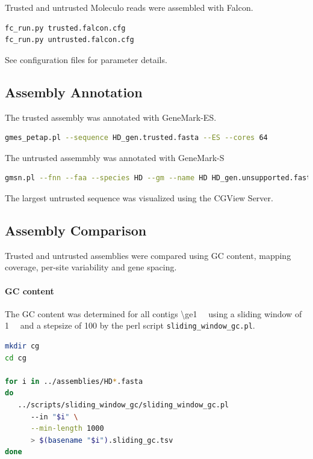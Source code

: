 \documentclass[12pt,a4paper]{scrartcl}
\begin{document}
Trusted and untrusted Moleculo reads were assembled with Falcon.

\begin{lstlisting}[language=bash]
fc_run.py trusted.falcon.cfg
fc_run.py untrusted.falcon.cfg
\end{lstlisting}

See configuration files for parameter details.

\subsection*{Assembly Annotation}
The trusted assembly was annotated with GeneMark-ES.

\begin{lstlisting}[language=bash]
gmes_petap.pl --sequence HD_gen.trusted.fasta --ES --cores 64
\end{lstlisting}

The untrusted assemmbly was annotated with GeneMark-S

\begin{lstlisting}[language=bash]
gmsn.pl --fnn --faa --species HD --gm --name HD HD_gen.unsupported.fasta
\end{lstlisting}

The largest untrusted sequence was visualized using the CGView Server.

\subsection*{Assembly Comparison}

Trusted and untrusted assemblies were compared using GC content, mapping coverage, per-site variability and gene spacing.

\paragraph{GC content}
The GC content was determined for all contigs
\SI{\ge1}{\kilo\basepair} using a sliding window of
\SI{1}{\kilo\basepair} and a stepsize of \SI{100}{\basepair} by the
perl script \texttt{sliding\_window\_gc.pl}.

\begin{lstlisting}[language=bash]
mkdir cg
cd cg

for i in ../assemblies/HD*.fasta
do
   ../scripts/sliding_window_gc/sliding_window_gc.pl
      --in "$i" \
      --min-length 1000
      > $(basename "$i").sliding_gc.tsv
done
\end{lstlisting}
\end{document}
